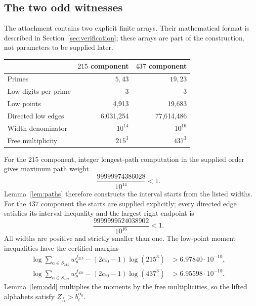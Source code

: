 \documentclass[11pt]{article}
\theoremstyle{definition}
\theoremstyle{remark}
\newcommand{\al}{\alpha_0}
\begin{document}
\subsection{The two odd witnesses}
The attachment contains two explicit finite arrays. Their mathematical
format is described in Section~\ref{sec:verification}; these arrays are
part of the construction, not parameters to be supplied later.
\begin{center}
\begin{tabular}{lrr}\toprule
&$215$ component&$437$ component\\\midrule
Primes&$5,43$&$19,23$\\
Low digits per prime&3&3\\
Low points&4,913&19,683\\
Directed low edges&6,031,254&77,614,486\\
Width denominator&$10^{14}$&$10^{16}$\\
Free multiplicity&$215^3$&$437^3$\\\bottomrule
\end{tabular}
\end{center}
For the $215$ component, integer longest-path computation in the supplied
order gives maximum path weight
\[
 \frac{99999974386028}{10^{14}}<1.
\]
Lemma~\ref{lem:paths} therefore constructs the interval starts from the
listed widths. For the $437$ component the starts are supplied explicitly;
every directed edge satisfies its interval inequality and the largest
right endpoint is
\[
 \frac{9999999524038902}{10^{16}}<1.
\]
All widths are positive and strictly smaller than one. The low-point
moment inequalities have the certified margins
\begin{align}
 \log\sum_{a\in S_{215}}w_a^{f_{215}}
       -(2\al-1)\log(215^3)&>6.97840\cdot10^{-10},\label{eq:odd215margin}\\
 \log\sum_{a\in S_{437}}w_a^{f_{437}}
       -(2\al-1)\log(437^3)&>6.95598\cdot10^{-10}.\label{eq:odd437margin}
\end{align}
Lemma~\ref{lem:odd} multiplies the moments by the free multiplicities,
so the lifted alphabets satisfy $Z_{f_i}>b_i^{\al}$.
\end{document}
